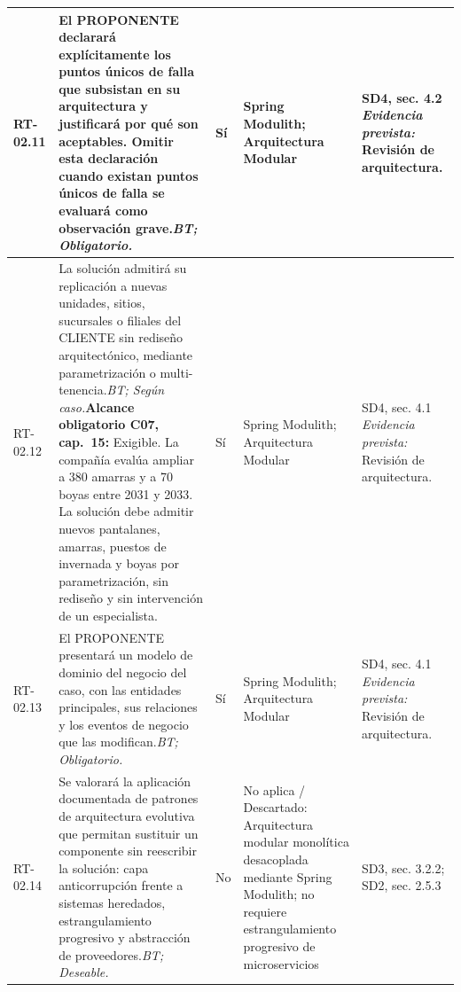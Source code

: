 \begin{paginaHorizontalSynaptix}
\begin{longtable}{|L{0.09\AnchoMatrizTDoce}|L{0.385\AnchoMatrizTDoce}|L{0.065\AnchoMatrizTDoce}|L{0.18\AnchoMatrizTDoce}|L{0.28\AnchoMatrizTDoce}|}
RT-\allowbreak{}02.\allowbreak{}11 &
El PROPONENTE declarará explícitamente los puntos únicos de falla que subsistan en su arquitectura y justificará por qué son aceptables. Omitir esta declaración cuando existan puntos únicos de falla se evaluará como observación grave.\newline\textit{BT; Obligatorio.} &
Sí &
Spring Modulith; Arquitectura Modular &
SD4, sec. 4.2 \newline\textit{Evidencia prevista:} Revisión de arquitectura. \\ \hline

RT-\allowbreak{}02.\allowbreak{}12 &
La solución admitirá su replicación a nuevas unidades, sitios, sucursales o filiales del CLIENTE sin rediseño arquitectónico, mediante parametrización o multi-tenencia.\newline\textit{BT; Según caso.}\newline\textbf{Alcance obligatorio C07, cap.~15:} Exigible. La compañía evalúa ampliar a 380 amarras y a 70 boyas entre 2031 y 2033. La solución debe admitir nuevos pantalanes, amarras, puestos de invernada y boyas por parametrización, sin rediseño y sin intervención de un especialista. &
Sí &
Spring Modulith; Arquitectura Modular &
SD4, sec. 4.1 \newline\textit{Evidencia prevista:} Revisión de arquitectura. \\ \hline

RT-\allowbreak{}02.\allowbreak{}13 &
El PROPONENTE presentará un modelo de dominio del negocio del caso, con las entidades principales, sus relaciones y los eventos de negocio que las modifican.\newline\textit{BT; Obligatorio.} &
Sí &
Spring Modulith; Arquitectura Modular &
SD4, sec. 4.1 \newline\textit{Evidencia prevista:} Revisión de arquitectura. \\ \hline

RT-\allowbreak{}02.\allowbreak{}14 &
Se valorará la aplicación documentada de patrones de arquitectura evolutiva que permitan sustituir un componente sin reescribir la solución: capa anticorrupción frente a sistemas heredados, estrangulamiento progresivo y abstracción de proveedores.\newline\textit{BT; Deseable.} &
No &
No aplica / Descartado: Arquitectura modular monolítica desacoplada mediante Spring Modulith; no requiere estrangulamiento progresivo de microservicios &
SD3, sec. 3.2.2; SD2, sec. 2.5.3 \\ \hline


\end{longtable}
\end{paginaHorizontalSynaptix}
